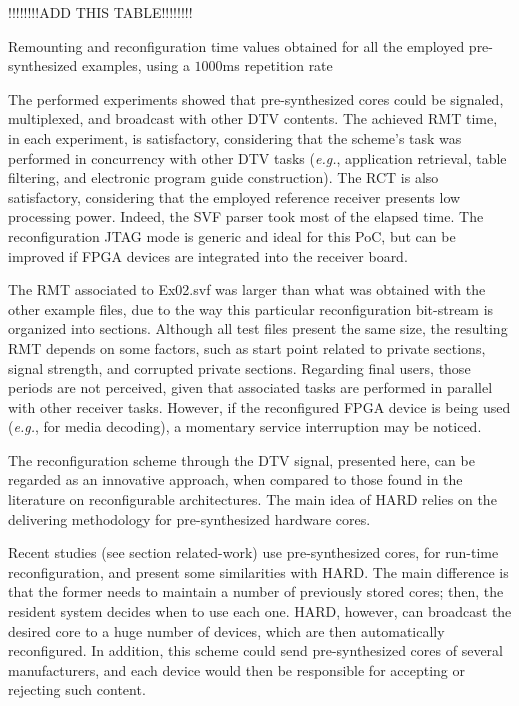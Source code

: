 \begin{table}[ht]
\renewcommand{\arraystretch}{1.18}
\footnotesize{ !!!!!!!!ADD THIS TABLE!!!!!!!! }
\caption{Remounting and reconfiguration time values obtained for all the employed pre-synthesized examples, using a $1000$ms repetition rate}
\label{table:table-eight}
\end{table}

The performed experiments showed that pre-synthesized cores could be signaled, multiplexed, and broadcast with other DTV contents. The achieved RMT time, in each experiment, is satisfactory, considering that the scheme's task was performed in concurrency with other DTV tasks ({\em e.g.}, application retrieval, table filtering, and electronic program guide construction). The RCT is also satisfactory, considering that the employed reference receiver presents low processing power. Indeed, the SVF parser took most of the elapsed time. The reconfiguration JTAG mode is generic and ideal for this PoC, but can be improved if FPGA devices are integrated into the receiver board.

The RMT associated to Ex02.svf was larger than what was obtained with the other example files, due to the way this particular reconfiguration bit-stream is organized into sections. Although all test files present the same size, the resulting RMT depends on some factors, such as start point related to private sections, signal strength, and corrupted private sections. Regarding final users, those periods are not perceived, given that associated tasks are performed in parallel with other receiver tasks. However, if the reconfigured FPGA device is being used ({\em e.g.}, for media decoding), a momentary service interruption may be noticed.

The reconfiguration scheme through the DTV signal, presented here, can be regarded as an innovative approach, when compared to those found in the literature on reconfigurable architectures. The main idea of HARD relies on the delivering methodology for pre-synthesized hardware cores. 

Recent studies (see section related-work) use pre-synthesized cores, for run-time reconfiguration, and present some similarities with HARD. The main difference is that the former needs to maintain a number of previously stored cores; then, the resident system decides when to use each one. HARD, however, can broadcast the desired core to a huge number of devices, which are then automatically reconfigured. In addition, this scheme could send pre-synthesized cores of several manufacturers, and each device would then be responsible for accepting or rejecting such content.

